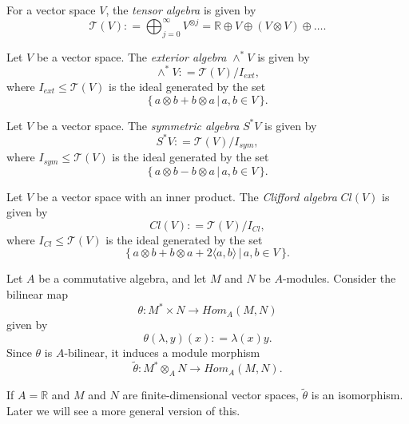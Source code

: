 \documentclass{ximera}
\begin{document}
\begin{definition}
    For a vector space $V$, the \emph{tensor algebra} is given by 
    \[   \mathcal{T} (V) : = \bigoplus_{j = 0}^{\infty} V^{\otimes j} = \mathbb{R} \oplus V \oplus (V \otimes V) \oplus \ldots .                             \]
\end{definition}

\begin{definition}
    Let $V$ be a vector space. The \emph{exterior algebra} $\wedge^{\ast} V$ is given by 
    \[  \wedge^{\ast} V : =     \mathcal{T}(V) / I_{ext} ,              \]
    where  $I_{ext} \leq \mathcal{T} (V)$ is the ideal generated by the set  
    \[  \{  \, a \otimes b + b \otimes a \, \vert \,  a , b \in V \,  \} .  \]
\end{definition}


\begin{definition}
    Let $V$ be a vector space. The \emph{symmetric algebra} $S ^{\ast} V$ is given by 
    \[  S ^{\ast} V : =     \mathcal{T}(V) / I_{sym} ,              \]
    where  $I_{sym} \leq \mathcal{T} (V)$ is the ideal generated by the set  
    \[  \{  \, a \otimes b - b \otimes a \, \vert \,  a, b \in V\,  \} .  \]
\end{definition}


\begin{definition}
    Let $V$ be a vector space with an inner product. The \emph{Clifford algebra} $Cl( V)$ is given by 
    \[  Cl (V) : =     \mathcal{T}(V) / I_{Cl} ,              \]
    where  $I_{Cl} \leq \mathcal{T} (V)$ is the ideal generated by the set  
    \[  \{  \, a \otimes b + b \otimes a  + 2 \langle a, b \rangle \, \vert \,  a, b \in V  \,  \} .  \]
\end{definition}


\begin{theorem}[Duality]
    Let $A$ be a commutative algebra, and let  $M$ and $N$ be $A$-modules. Consider the bilinear map 
    \[ \theta :  M^{\ast} \times N \to Hom _A (M , N) \] 
    given by 
    \[ \theta ( \lambda , y ) (x ) : = \lambda (x) y . \]
    Since $\theta$ is $A$-bilinear, it induces a module morphism 
    \[      \tilde{\theta} : M ^{\ast} \otimes _A N \to Hom _A( M,N) .                   \]
\end{theorem}

If $A = \mathbb{R}$ and  $M$ and $N$ are finite-dimensional vector spaces, $\tilde{\theta}$ is an isomorphism. Later we will see a more general version of this. 
\end{document}
